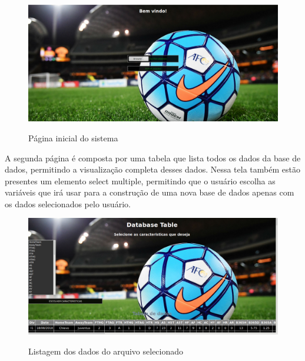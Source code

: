 \begin{figure}[htbp]
	\begin{center}
		\includegraphics[width=.9\linewidth]{imagens/home.png}\\
	\end{center}
	\caption[Página inicial do sistema]{Página inicial do sistema}
	\label{fig:logo}
\end{figure}
\newpage
A segunda página é composta por uma tabela que lista todos os dados da base de dados, permitindo a visualização completa desses dados. Nessa tela também estão presentes um elemento select multiple, permitindo que o usuário escolha as variáveis que irá usar para a construção de uma nova base de dados apenas com os dados selecionados pelo usuário.
\begin{figure}[htbp]
	\begin{center}
		\includegraphics[width=.9\linewidth]{imagens/listagem.png}\\
	\end{center}
	\caption[Listagem dos dados do arquivo selecionado]{Listagem dos dados do arquivo selecionado}
	\label{fig:logo}
\end{figure}
